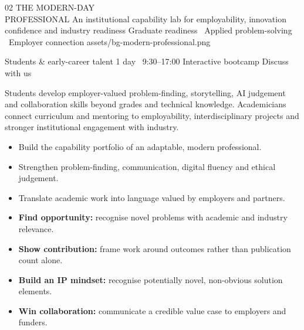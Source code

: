 \WorkshopHeader
  {02}
  {THE MODERN-DAY\\PROFESSIONAL}
  {An institutional capability lab for employability, innovation confidence and industry readiness}
  {Graduate readiness \textbullet\ Applied problem-solving \textbullet\ Employer connection}
  {\faUserGraduate}
  {assets/bg-modern-professional.png}

\MetaStrip
  {Students \& early-career talent}
  {1 day \textbar\ 9:30--17:00}
  {Interactive bootcamp}
  {Discuss with us}

\begin{minipage}[t]{0.615\textwidth}
  \vspace{0pt}
  \begin{brochurecard}[colback=Accent!3!white]
    \WhyItMatters
      {Students develop employer-valued problem-finding, storytelling, AI judgement and collaboration skills beyond grades and technical knowledge.}
      {Academicians connect curriculum and mentoring to employability, interdisciplinary projects and stronger institutional engagement with industry.}
  \end{brochurecard}

  \begin{brochurecard}
    \begin{minipage}[t]{0.485\linewidth}
      \begin{itemize}
        \item Build the capability portfolio of an adaptable, modern professional.
        \item Strengthen problem-finding, communication, digital fluency and ethical judgement.
        \item Translate academic work into language valued by employers and partners.
      \end{itemize}
    \end{minipage}\hfill
    \begin{minipage}[t]{0.485\linewidth}
      \begin{itemize}
        \item \textbf{Find opportunity:} recognise novel problems with academic and industry relevance.
        \item \textbf{Show contribution:} frame work around outcomes rather than publication count alone.
        \item \textbf{Build an IP mindset:} recognise potentially novel, non-obvious solution elements.
        \item \textbf{Win collaboration:} communicate a credible value case to employers and funders.
      \end{itemize}
    \end{minipage}
  \end{brochurecard}


\end{minipage}
